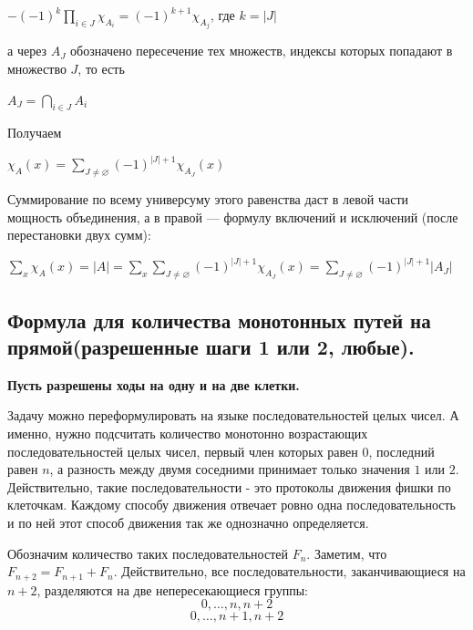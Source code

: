 \documentclass[a4paper, 10pt]{article}
\begin{document}
\begin{center}
    $-(-1)^k \displaystyle \prod_{i \in J} \chi_{A_i} = (-1)^{k + 1} \chi_{A_j}$, где $k = |J|$ \\
\end{center}

а через $A_J$ обозначено пересечение тех множеств, индексы которых попадают в множество $J$, то есть

\begin{center}
    $A_J = \displaystyle \bigcap_{i \in J} A_i$
\end{center}

Получаем

\begin{center}
    $\chi_A(x) = \displaystyle \sum_{J \neq \varnothing} (-1)^{|J| + 1} \chi_{A_J}(x)$
\end{center}

Суммирование по всему универсуму этого равенства даст в левой части мощность объединения, а в правой — формулу включений и исключений (после перестановки двух сумм):

\begin{center}
    $\displaystyle \sum_x \chi_A(x) = |A| = \sum_x \sum_{J \neq \varnothing} (-1)^{|J| + 1} \chi_{A_J}(x) = \sum_{J \neq \varnothing} (-1)^{|J| + 1} |A_J|$
\end{center}


\subsection{Формула для количества монотонных путей на прямой(разрешенные шаги 1 или 2, любые).}

\textbf{Пусть разрешены ходы на одну и на две клетки.}

Задачу можно переформулировать на языке последовательностей целых чисел.
А именно, нужно подсчитать количество монотонно возрастающих последовательностей целых чисел, первый член которых равен 0, последний равен $n$, а разность между двумя соседними принимает только значения $1$ или $2$. Действительно, такие последовательности - это протоколы движения фишки по клеточкам. Каждому способу движения отвечает ровно одна последовательность и по ней этот способ движения так же однозначно определяется.

Обозначим количество таких последовательностей $F_n$. Заметим, что $F_{n + 2}= F_{n + 1} + F_n$. Действительно, все последовательности, заканчивающиеся на $n + 2$, разделяются на две непересекающиеся группы: $$0, \dots, n, n + 2$$ $$0, \dots, n + 1, n + 2$$
\end{document}
